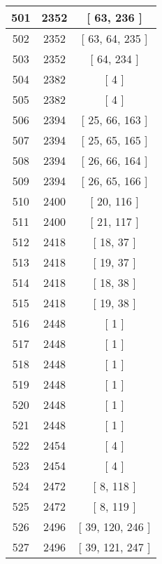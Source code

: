 \begin{center}
\begin{longtable}[H]{|| c c c ||}
\hline
501 & 2352 & [ 63, 236 ] \\ 
\hline
502 & 2352 & [ 63, 64, 235 ] \\ 
\hline
503 & 2352 & [ 64, 234 ] \\ 
\hline
504 & 2382 & [ 4 ] \\ 
\hline
505 & 2382 & [ 4 ] \\ 
\hline
506 & 2394 & [ 25, 66, 163 ] \\ 
\hline
507 & 2394 & [ 25, 65, 165 ] \\ 
\hline
508 & 2394 & [ 26, 66, 164 ] \\ 
\hline
509 & 2394 & [ 26, 65, 166 ] \\ 
\hline
510 & 2400 & [ 20, 116 ] \\ 
\hline
511 & 2400 & [ 21, 117 ] \\ 
\hline
512 & 2418 & [ 18, 37 ] \\ 
\hline
513 & 2418 & [ 19, 37 ] \\ 
\hline
514 & 2418 & [ 18, 38 ] \\ 
\hline
515 & 2418 & [ 19, 38 ] \\ 
\hline
516 & 2448 & [ 1 ] \\ 
\hline
517 & 2448 & [ 1 ] \\ 
\hline
518 & 2448 & [ 1 ] \\ 
\hline
519 & 2448 & [ 1 ] \\ 
\hline
520 & 2448 & [ 1 ] \\ 
\hline
521 & 2448 & [ 1 ] \\ 
\hline
522 & 2454 & [ 4 ] \\ 
\hline
523 & 2454 & [ 4 ] \\ 
\hline
524 & 2472 & [ 8, 118 ] \\ 
\hline
525 & 2472 & [ 8, 119 ] \\ 
\hline
526 & 2496 & [ 39, 120, 246 ] \\ 
\hline
527 & 2496 & [ 39, 121, 247 ] \\ 
\hline
\end{longtable}
\end{center}
